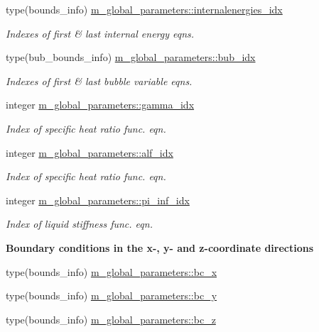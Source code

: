\begin{Indent}
\begin{DoxyCompactItemize}
type(bounds\+\_\+info) \hyperlink{namespacem__global__parameters_aac5ed9f316eeebbe04258bb1120cbea4}{m\+\_\+global\+\_\+parameters\+::internalenergies\+\_\+idx}
\begin{DoxyCompactList}\small\item\em Indexes of first \& last internal energy eqns. \end{DoxyCompactList}\item 
type(bub\+\_\+bounds\+\_\+info) \hyperlink{namespacem__global__parameters_a9a425d1bd91d1765043adf8410b98bf7}{m\+\_\+global\+\_\+parameters\+::bub\+\_\+idx}
\begin{DoxyCompactList}\small\item\em Indexes of first \& last bubble variable eqns. \end{DoxyCompactList}\item 
integer \hyperlink{namespacem__global__parameters_a4ecdedaf3db880f8d71dbefc816322f8}{m\+\_\+global\+\_\+parameters\+::gamma\+\_\+idx}
\begin{DoxyCompactList}\small\item\em Index of specific heat ratio func. eqn. \end{DoxyCompactList}\item 
integer \hyperlink{namespacem__global__parameters_af451fa7762c859ef20552498fa6edb16}{m\+\_\+global\+\_\+parameters\+::alf\+\_\+idx}
\begin{DoxyCompactList}\small\item\em Index of specific heat ratio func. eqn. \end{DoxyCompactList}\item 
integer \hyperlink{namespacem__global__parameters_a7db1a23566279bdbc7da68850c596c69}{m\+\_\+global\+\_\+parameters\+::pi\+\_\+inf\+\_\+idx}
\begin{DoxyCompactList}\small\item\em Index of liquid stiffness func. eqn. \end{DoxyCompactList}\end{DoxyCompactItemize}
\end{Indent}
\begin{Indent}\textbf{ Boundary conditions in the x-\/, y-\/ and z-\/coordinate directions}\par
\begin{DoxyCompactItemize}
\item 
type(bounds\+\_\+info) \hyperlink{namespacem__global__parameters_aa46a7f3638e49fa9ec33ea859b9e6a5a}{m\+\_\+global\+\_\+parameters\+::bc\+\_\+x}
\item 
type(bounds\+\_\+info) \hyperlink{namespacem__global__parameters_a68eaaca2982b39252417b29ef5d0f9c3}{m\+\_\+global\+\_\+parameters\+::bc\+\_\+y}
\item 
type(bounds\+\_\+info) \hyperlink{namespacem__global__parameters_a6769808569174ff0eef096e958889837}{m\+\_\+global\+\_\+parameters\+::bc\+\_\+z}
\end{DoxyCompactItemize}
\end{Indent}
